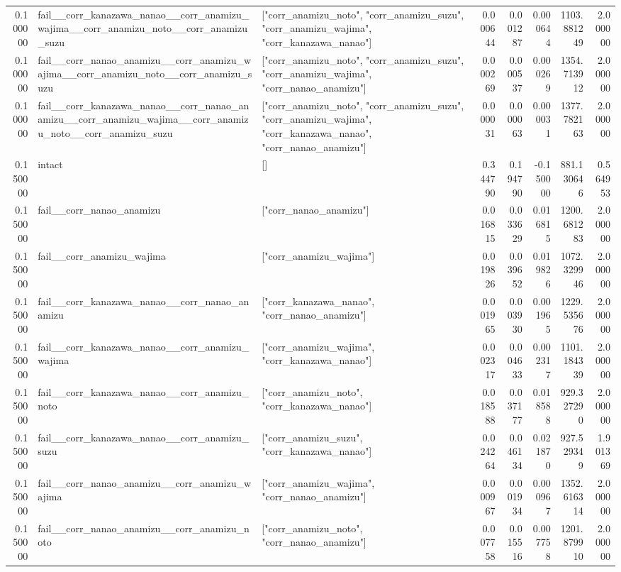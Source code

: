 \begin{tabular}{rllrrrrr}
0.100000 & fail\_\_corr\_kanazawa\_nanao\_\_corr\_anamizu\_wajima\_\_corr\_anamizu\_noto\_\_corr\_anamizu\_suzu & ["corr\_anamizu\_noto", "corr\_anamizu\_suzu", "corr\_anamizu\_wajima", "corr\_kanazawa\_nanao"] & 0.000644 & 0.001287 & 0.000644 & 1103.881249 & 2.000000 \\
0.100000 & fail\_\_corr\_nanao\_anamizu\_\_corr\_anamizu\_wajima\_\_corr\_anamizu\_noto\_\_corr\_anamizu\_suzu & ["corr\_anamizu\_noto", "corr\_anamizu\_suzu", "corr\_anamizu\_wajima", "corr\_nanao\_anamizu"] & 0.000269 & 0.000537 & 0.000269 & 1354.713912 & 2.000000 \\
0.100000 & fail\_\_corr\_kanazawa\_nanao\_\_corr\_nanao\_anamizu\_\_corr\_anamizu\_wajima\_\_corr\_anamizu\_noto\_\_corr\_anamizu\_suzu & ["corr\_anamizu\_noto", "corr\_anamizu\_suzu", "corr\_anamizu\_wajima", "corr\_kanazawa\_nanao", "corr\_nanao\_anamizu"] & 0.000031 & 0.000063 & 0.000031 & 1377.782163 & 2.000000 \\
0.150000 & intact & [] & 0.344790 & 0.194790 & -0.150000 & 881.130646 & 0.564953 \\
0.150000 & fail\_\_corr\_nanao\_anamizu & ["corr\_nanao\_anamizu"] & 0.016815 & 0.033629 & 0.016815 & 1200.681283 & 2.000000 \\
0.150000 & fail\_\_corr\_anamizu\_wajima & ["corr\_anamizu\_wajima"] & 0.019826 & 0.039652 & 0.019826 & 1072.329946 & 2.000000 \\
0.150000 & fail\_\_corr\_kanazawa\_nanao\_\_corr\_nanao\_anamizu & ["corr\_kanazawa\_nanao", "corr\_nanao\_anamizu"] & 0.001965 & 0.003930 & 0.001965 & 1229.535676 & 2.000000 \\
0.150000 & fail\_\_corr\_kanazawa\_nanao\_\_corr\_anamizu\_wajima & ["corr\_anamizu\_wajima", "corr\_kanazawa\_nanao"] & 0.002317 & 0.004633 & 0.002317 & 1101.184339 & 2.000000 \\
0.150000 & fail\_\_corr\_kanazawa\_nanao\_\_corr\_anamizu\_noto & ["corr\_anamizu\_noto", "corr\_kanazawa\_nanao"] & 0.018588 & 0.037177 & 0.018588 & 929.327290 & 2.000000 \\
0.150000 & fail\_\_corr\_kanazawa\_nanao\_\_corr\_anamizu\_suzu & ["corr\_anamizu\_suzu", "corr\_kanazawa\_nanao"] & 0.024264 & 0.046134 & 0.021870 & 927.529349 & 1.901369 \\
0.150000 & fail\_\_corr\_nanao\_anamizu\_\_corr\_anamizu\_wajima & ["corr\_anamizu\_wajima", "corr\_nanao\_anamizu"] & 0.000967 & 0.001934 & 0.000967 & 1352.616314 & 2.000000 \\
0.150000 & fail\_\_corr\_nanao\_anamizu\_\_corr\_anamizu\_noto & ["corr\_anamizu\_noto", "corr\_nanao\_anamizu"] & 0.007758 & 0.015516 & 0.007758 & 1201.879910 & 2.000000 \\

\end{tabular}
